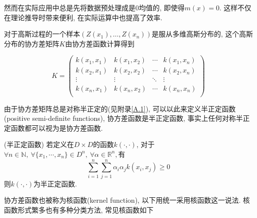                 然而在实际应用中总是先将数据预处理成是$0$均值的, 即使得$m(x)=0$. 这样不仅在理论推导时带来便利, 在实际运算中也提高了效率. 

                对于高斯过程的一个样本$(Z(x_{1}),\dots,Z(x_{n}))$是服从多维高斯分布的, 这个高斯分布的协方差矩阵$K$由协方差函数计算得到

                \begin{equation}
                    K= \begin{pmatrix}
                                k(x_{1},x_{1}) & k(x_{1},x_{2}) & \cdots & k(x_{1},x_{n}) \\
                                k(x_{2},x_{1}) & k(x_{2},x_{2}) & \cdots & k(x_{2},x_{n}) \\
                                \vdots         & \vdots         & \ddots & \vdots \\
                                k(x_{n},x_{1}) & k(x_{n},x_{2}) & \cdots & k(x_{n},x_{n}) \\
                            \end{pmatrix}
                \end{equation}

                由于协方差矩阵总是对称半正定的(见附录\ref{A.1}), 可以以此来定义半正定函数(positive semi-definite functions), 协方差函数是半正定函数, 事实上任何对称半正定函数都可以视为是协方差函数.

                \begin{definition}(半正定函数)
                    若定义在$D\times D$的函数$k(\cdot,\cdot)$, 对于$\forall n\in\mathds{N},\ \forall \{x_{1},\cdots,x_{n}\}\in D^{n},\ \forall \alpha\in\mathds{R}^{n},$有
                    \begin{equation*}
                        \sum^{n}_{i=1}\sum^{n}_{j=1}\alpha_{i}\alpha_{j}k(x_{i},x_{j})\geqslant 0
                    \end{equation*}
                    则$k(\cdot,\cdot)$为半正定函数.
                \end{definition}
                
                协方差函数也被称为核函数(kernel function), 以下用统一采用核函数这一说法. 核函数形式繁多也有多种分类方法, 常见核函数如下


